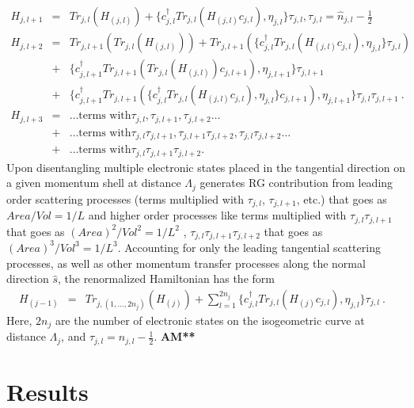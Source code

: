 \documentclass[aps,prl,preprint,groupedaddress]{revtex4-2}
\begin{document}
\begin{eqnarray}
H_{j,l+1}&=&Tr_{j,l}(H_{(j,l)})+\lbrace c^{\dagger}_{j,l}Tr_{j,l}(H_{(j,l)}c_{j,l}),\eta_{j,l}\rbrace\tau_{j,l}, \tau_{j,l}=\hat{n}_{j,l}-\frac{1}{2}\nonumber\\ 
H_{j,l+2}&=&Tr_{j,l+1}(Tr_{j,l}(H_{(j,l)}))+Tr_{j,l+1}(\lbrace c^{\dagger}_{j,l}Tr_{j,l}(H_{(j,l)}c_{j,l}),\eta_{j,l}\rbrace\tau_{j,l})\nonumber\\
&+&\lbrace c^{\dagger}_{j,l+1}Tr_{j,l+1}(Tr_{j,l}(H_{(j,l)})c_{j,l+1}),\eta_{j,l+1}\rbrace\tau_{j,l+1}\nonumber\\
&+&\lbrace c^{\dagger}_{j,l+1}Tr_{j,l+1}(\lbrace c^{\dagger}_{j,l}Tr_{j,l}(H_{(j,l)}c_{j,l}),\eta_{j,l}\rbrace c_{j,l+1}),\eta_{j,l+1}\rbrace\tau_{j,l}\tau_{j,l+1}~.\nonumber\\
H_{j,l+3}&=&\ldots\text{terms with} \tau_{j,l}, \tau_{j,l+1}, \tau_{j,l+2}\ldots\nonumber\\
 &+& \ldots\text{terms with} \tau_{j,l}\tau_{j,l+1}, \tau_{j,l+1}\tau_{j,l+2}, \tau_{j,l}\tau_{j,l+2}\ldots\nonumber\\
 &+&\ldots\text{terms with}\tau_{j,l}\tau_{j,l+1}\tau_{j,l+2}.
\label{2ndDisentanglement}
\end{eqnarray}
Upon disentangling multiple electronic states placed in the tangential direction on a given momentum shell at distance $\Lambda_{j}$ generates RG contribution from leading order scattering processes (terms multiplied with $\tau_{j,l}$, $\tau_{j,l+1}$, etc.) that goes as $Area/Vol=1/L$ and higher order processes like terms multiplied with $\tau_{j,l}\tau_{j,l+1}$ that goes as $(Area)^{2}/Vol^{2}=1/L^{2}$ , $\tau_{j,l}\tau_{j,l+1}\tau_{j,l+2}$ that goes as $(Area)^{3}/Vol^{3}=1/L^{3}$. 
Accounting for only the leading tangential scattering processes, as well as other momentum transfer processes along the normal direction $\hat{s}$, the renormalized Hamiltonian has the form
\begin{eqnarray}
H_{(j-1)}&=&Tr_{j,(1,\ldots,2n_{j})}(H_{(j)})+\sum_{l=1}^{2n_{j}}\lbrace c^{\dagger}_{j,l}Tr_{j,l}(H_{(j)}c_{j,l}),\eta_{j,l}\rbrace\tau_{j,l}~.~~~\label{HRG}
\end{eqnarray}
Here, $2n_{j}$ are the number of electronic states on the isogeometric curve at distance $\Lambda_{j}$, and $\tau_{j,l}= n_{j,l}-\frac{1}{2}$.
\textbf{AM**}
\section{Results}
\par\noindent
\end{document}
